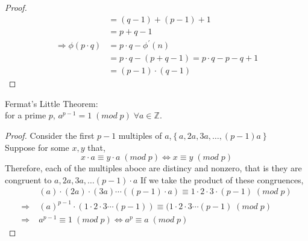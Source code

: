 \begin{theorem}
\begin{proof}
\begin{align*}
                                        & = (q-1) + (p-1) + 1                                                                                                                                                              \\&= p + q - 1                                                                                                                                                  \\
            \Rightarrow \phi(p \cdot q) & = p\cdot q - \phi^{'}(n)                                                                                                                                                         \\&= p \cdot q - (p + q - 1) = p \cdot q - p - q + 1                                                                                                        \\
                                        & = (p-1) \cdot (q-1)
        \end{align*}

    \end{proof}
\end{theorem}

\begin{theorem}
    Fermat's Little Theorem: \\
    \hspace*{2.5cm} for a prime $p$,  $a ^{p-1} = 1 \; (mod \; p) \; \forall a \in \mathbb{Z}$.
    \begin{proof}
        Consider the first $p-1$ multiples of $a$,$\left\{a, 2a, 3a, \ldots, (p-1) a\right\}$ \\
        Suppose for some $x, y$ that,
        \[
            x \cdot a \equiv y \cdot a \; (mod \; p) \Longleftrightarrow
            x \equiv y \; (mod \; p)
        \]
        Therefore, each of the multiples aboce are distincy and nonzero,
        that is they are congruent to $a, 2a, 3a, \ldots (p-1) \cdot a$
        If we take the product of these congruences,
        \begin{align*}
                           & (a) \cdot (2a) \cdot (3a) \cdots ((p-1) \cdot a) \equiv 1 \cdot 2 \cdot 3 \cdot (p-1)\; (mod \; p)    \\
            \Rightarrow \; & (a)^{p-1} \cdot (1 \cdot 2 \cdot 3 \cdots (p-1)) \equiv (1 \cdot 2 \cdot 3 \cdots (p-1) \; (mod \; p) \\
            \Rightarrow \; & a^{p-1} \equiv 1 \; (mod \; p) \Longleftrightarrow a^p \equiv a \; (mod \; p)
        \end{align*}
    \end{proof}
\end{theorem}
